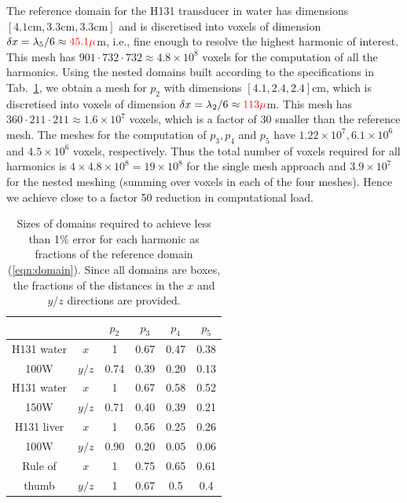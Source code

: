 \documentclass[preprint]{JASA}
\newcommand{\red}[1]{{\color{red} #1}}
\begin{document}
The reference domain for the H131 transducer in water has dimensions 
$[4.1\text{cm},3.3\text{cm},3.3\text{cm}]$ and is discretised into voxels of dimension 
$\delta x = \lambda_5/6\approx \red{45.1\mu}$m, i.e., fine enough to 
resolve the highest harmonic of interest. This mesh has 
$901\cdot 732\cdot 732\approx 4.8\times 10^8$ voxels for the computation of all 
the harmonics. Using the nested domains built according to the specifications in 
Tab.~\ref{tab:convergence_domain}, we obtain a mesh for $p_2$ with dimensions
$[4.1, 2.4, 2.4]$cm, which is discretised into voxels of dimension 
$\delta x = \lambda_2/6\approx \red{113\mu}$m. This mesh has 
$360\cdot 211\cdot 211\approx 1.6\times 10^7$ voxels, which is a factor of 
30 smaller than the reference mesh. \red{The meshes for the computation of $p_3, p_4$
and $p_5$ have $1.22\times10^7, 6.1\times10^6$ and $4.5\times10^6$ voxels, respectively.
Thus the total number of voxels required for all harmonics is $4\times4.8\times 10^8=19\times 10^8$ for 
the single mesh approach and $3.9\times 10^7$ for the nested meshing (summing over 
voxels in each of the four meshes). Hence we achieve close to a factor 50 reduction in computational load.}

\begin{table}[h!]
    \centering
    \begin{tabular}{c | c  c  c  c  c}
        \hline\hline
             &     & $p_2$ & $p_3$ & $p_4$ & $p_5$ \\
        \hline
        H131 water & $x$   & 1 & 0.67 & 0.47 & 0.38 \\
        100W & $y/z$ & 0.74 & 0.39 & 0.20 & 0.13 \\
        \hline
        H131 water & $x$   & 1 & 0.67 & 0.58 & 0.52 \\
        150W & $y/z$ & 0.71 & 0.40 & 0.39 & 0.21 \\
        \hline
        H131 liver & $x$   & 1 & 0.56 & 0.25 & 0.26 \\
        100W & $y/z$ & 0.90 & 0.20 & 0.05 & 0.06 \\
        \hline
        Rule of & $x$  &  1 & 0.75 & 0.65 & 0.61 \\
        thumb   & $y/z$ & 1 & 0.67 & 0.5 & 0.4
    \end{tabular}
    \caption{Sizes of domains required to achieve less than 1\% error for each 
    harmonic as fractions of the reference domain (\ref{eqn:domain}). Since all 
    domains are boxes, the fractions of the distances in the $x$ and $y/z$ directions 
    are provided.}
    \label{tab:convergence_domain}
\end{table}
\end{document}
